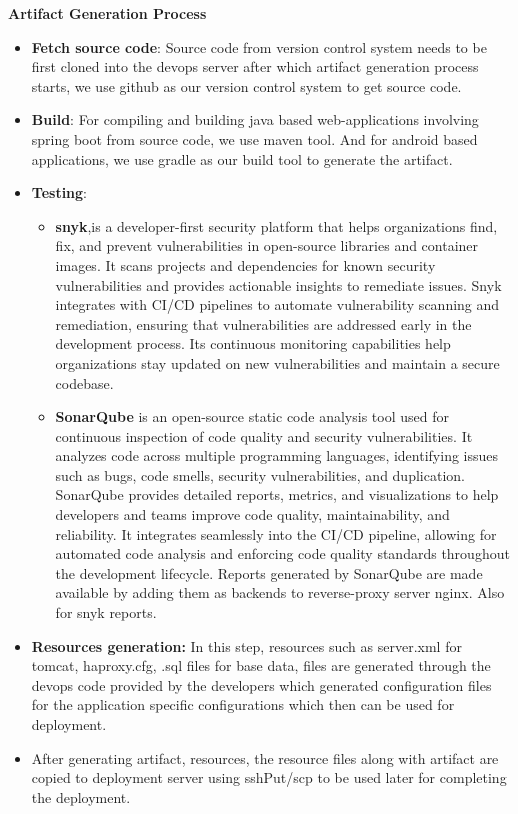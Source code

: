 \documentclass[12pt,a4paper,oneside]{report}
\begin{document}
\hspace{1cm}\textbf{{\large Artifact Generation Process}}
\begin{itemize}
	\item \textbf{Fetch source code}: Source code from version control system needs to be first cloned into the devops server after which artifact generation process starts, we use github as our version control system to get source code.
	\item \textbf{Build}: For compiling and building java based web-applications involving spring boot from source code, we use maven tool. And for android based applications, we use gradle as our build tool to generate the artifact.
	\item \textbf{Testing}:
	\begin{itemize}
		 \item \textbf{snyk},is a developer-first security platform that helps organizations find, fix, and prevent vulnerabilities in open-source libraries and container images. It scans projects and dependencies for known security vulnerabilities and provides actionable insights to remediate issues. Snyk integrates with CI/CD pipelines to automate vulnerability scanning and remediation, ensuring that vulnerabilities are addressed early in the development process. Its continuous monitoring capabilities help organizations stay updated on new vulnerabilities and maintain a secure codebase.
	\item \textbf{SonarQube} is an open-source static code analysis tool used for continuous inspection of code quality and security vulnerabilities. It analyzes code across multiple programming languages, identifying issues such as bugs, code smells, security vulnerabilities, and duplication. SonarQube provides detailed reports, metrics, and visualizations to help developers and teams improve code quality, maintainability, and reliability. It integrates seamlessly into the CI/CD pipeline, allowing for automated code analysis and enforcing code quality standards throughout the development lifecycle.
Reports generated by SonarQube are made available by adding them as backends to reverse-proxy server nginx. Also for snyk reports.
	\end{itemize}
	\item \textbf{Resources generation:} In this step, resources such as server.xml for tomcat, haproxy.cfg, .sql files for base data, files are generated through the devops code provided by the developers which generated configuration files for the application specific configurations which then can be used for deployment.

	\item After generating artifact, resources, the resource files along with artifact are copied to deployment server using sshPut/scp to be used later for completing the deployment.
\end{itemize}
\end{document}
